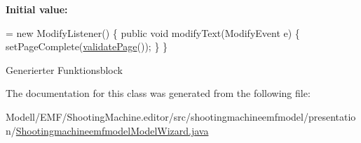 {\bfseries Initial value\-:}
\begin{DoxyCode}
=
            \textcolor{keyword}{new} ModifyListener() \{
                \textcolor{keyword}{public} \textcolor{keywordtype}{void} modifyText(ModifyEvent e) \{
                    setPageComplete(\hyperlink{classshootingmachineemfmodel_1_1presentation_1_1_shootingmachineemfmodel_model_wizard_1_1_shootia3fbc6bd8d9af3fefbb57f601e613dce_a7deaa7cc5166840a373de7e0feda8be1}{validatePage}());
                \}
            \}
\end{DoxyCode}
Generierter Funktionsblock 

The documentation for this class was generated from the following file\-:\begin{DoxyCompactItemize}
\item 
Modell/\-E\-M\-F/\-Shooting\-Machine.\-editor/src/shootingmachineemfmodel/presentation/\hyperlink{_shootingmachineemfmodel_model_wizard_8java}{Shootingmachineemfmodel\-Model\-Wizard.\-java}\end{DoxyCompactItemize}
